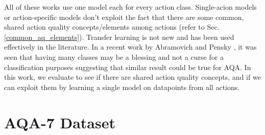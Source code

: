 \documentclass[10pt,twocolumn,letterpaper]{article}
\begin{document}
All of these works use one model each for every action class. Single-acion models or action-specific models don't exploit the fact that there are some common, shared action quality concepts/elements among actions (refer to Sec. \ref{common_aq_elements}). Transfer learning is not new and has been used effectively in the literature\cite{pratt1993discriminability, torrey2010transfer, luo2017label, misra2016cross, torralba2007sharing, yosinski2014transferable, Zamir_2018_CVPR}. In a recent work by Abramovich and Pensky \cite{abramovich}, it was seen that having many classes may be a blessing and not a curse for a classification purposes suggesting that similar result could be true for AQA. In this work, we evaluate to see if there are shared action quality concepts, and if we can exploit them by learning a single model on datapoints from all actions. 
\section{AQA-7 Dataset}
\label{sec_dataset}
\end{document}
